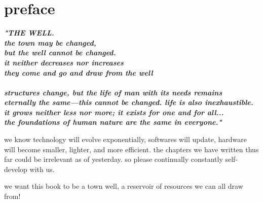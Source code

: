 
\SkipTocEntry\section*{preface}
\addtocounter{section}{1}
\begin{fullwidth}

{\itshape\bfseries "THE WELL.
\\
the town may be changed,
\\
but the well cannot be changed.
\\
it neither decreases nor increases
\\
they come and go and draw from the well
\\
\\
structures change, but the life of man with its needs remains
\\
eternally the same—this cannot be changed. life is also inexhaustible. 
\\
it grows neither less nor more; it exists for one and for all...
\\
the foundations of human nature are the same in everyone."

}

we know technology will evolve exponentially, softwares will update, hardware will become smaller, lighter, and more efficient. the chapters we have written thus far could be irrelevant as of yesterday. so please continually constantly self-develop with us. 

we want this book to be a town well, a reservoir of resources we can all draw from!

\clearpage
\end{fullwidth}
